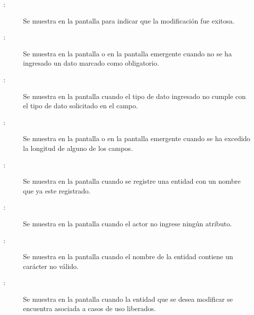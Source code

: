 	
\begin{description}
	\item[:] Se muestra en la pantalla  para indicar que la modificación fue exitosa.
	\item[:] Se muestra en la pantalla  o en la pantalla emergente  cuando no se ha ingresado un dato marcado como obligatorio.
	\item[:] Se muestra en la pantalla  cuando el tipo de dato ingresado no cumple con el tipo de dato solicitado en el campo.
	\item[:] Se muestra en la pantalla  o en la pantalla emergente  cuando se ha excedido la longitud de alguno de los campos.
	\item[:] Se muestra en la pantalla  cuando se registre una entidad con un nombre que ya este registrado.
	\item[:] Se muestra en la pantalla  cuando el actor no ingrese ningún atributo.
	\item[:] Se muestra en la pantalla  cuando el nombre de la entidad contiene un carácter no válido.
	\item[:] Se muestra en la pantalla  cuando la entidad que se desea modificar se encuentra asociada a casos de uso liberados.
	
\end{description}
